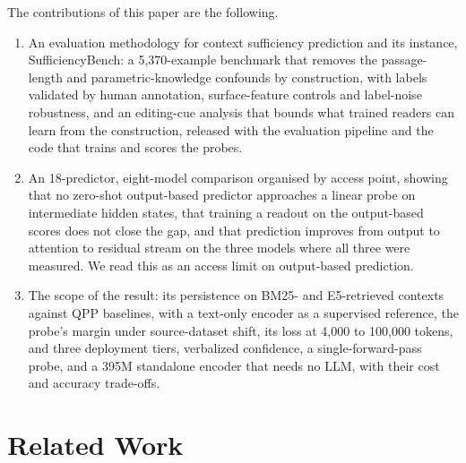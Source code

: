 \documentclass[acmsmall,screen,review]{acmart}
\newcommand{\bench}{SufficiencyBench}
\begin{document}
The contributions of this paper are the following.
\begin{enumerate}[leftmargin=*,topsep=2pt,itemsep=1pt]
\item An evaluation methodology for context sufficiency prediction and its instance, \bench{}: a 5,370-example benchmark that removes the passage-length and parametric-knowledge confounds by construction, with labels validated by human annotation, surface-feature controls and label-noise robustness, and an editing-cue analysis that bounds what trained readers can learn from the construction, released with the evaluation pipeline and the code that trains and scores the probes.
\item An 18-predictor, eight-model comparison organised by access point, showing that no zero-shot output-based predictor approaches a linear probe on intermediate hidden states, that training a readout on the output-based scores does not close the gap, and that prediction improves from output to attention to residual stream on the three models where all three were measured. We read this as an access limit on output-based prediction.
\item The scope of the result: its persistence on BM25- and E5-retrieved contexts against QPP baselines, with a text-only encoder as a supervised reference, the probe's margin under source-dataset shift, its loss at 4,000 to 100,000 tokens, and three deployment tiers, verbalized confidence, a single-forward-pass probe, and a 395M standalone encoder that needs no LLM, with their cost and accuracy trade-offs.
\end{enumerate}

\section{Related Work}
\label{sec:related}
\end{document}
